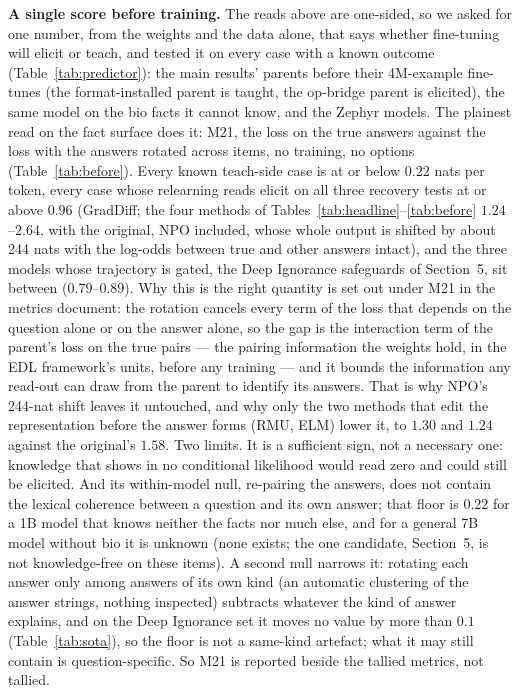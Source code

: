 \documentclass[11pt]{article}
\begin{document}
\medskip\noindent\textbf{A single score before training.} The reads above are one-sided, so we
asked for one number, from the weights and the data alone, that says whether fine-tuning will
elicit or teach, and tested it on every case with a known outcome (Table~\ref{tab:predictor}): the
main results' parents before their 4M-example fine-tunes (the format-installed parent is taught,
the op-bridge parent is elicited), the same model on the bio facts it cannot know, and the Zephyr
models. The plainest read on the fact surface does it: M21, the loss on the true answers against
the loss with the answers rotated across items, no training, no options (Table~\ref{tab:before}).
Every known teach-side case is at or below $0.22$ nats per token, every case whose relearning
reads elicit on all three recovery tests at or above $0.96$ (GradDiff; the four methods of
Tables~\ref{tab:headline}--\ref{tab:before} $1.24$--$2.64$, with the original, NPO included,
whose whole output is shifted by about 244 nats with the log-odds between true and other answers
intact), and the three models whose trajectory is gated, the Deep Ignorance safeguards of
Section~5, sit between ($0.79$--$0.89$). Why this is the right quantity is set out under M21 in the metrics document: the rotation
cancels every term of the loss that depends on the question alone or on the answer alone, so the
gap is the interaction term of the parent's loss on the true pairs --- the pairing information the
weights hold, in the EDL framework's units, before any training --- and it bounds the information
any read-out can draw from the parent to identify its answers. That is why NPO's 244-nat shift
leaves it untouched, and why only the two methods that edit the representation before the answer
forms (RMU, ELM) lower it, to $1.30$ and $1.24$ against the original's $1.58$. Two limits. It is a
sufficient sign, not a necessary one: knowledge that shows in no conditional likelihood would read
zero and could still be elicited. And its within-model null, re-pairing the
answers, does not contain the lexical coherence between a question and its own answer; that floor
is $0.22$ for a 1B model that knows neither the facts nor much else, and for a general 7B model
without bio it is unknown (none exists; the one candidate, Section~5, is not knowledge-free on these
items). A second null narrows it: rotating each answer only among answers of its own kind (an
automatic clustering of the answer strings, nothing inspected) subtracts whatever the kind of answer
explains, and on the Deep Ignorance set it moves no value by more than $0.1$ (Table~\ref{tab:sota}),
so the floor is not a same-kind artefact; what it may still contain is question-specific. So M21 is
reported beside the tallied metrics, not tallied.
\end{document}

